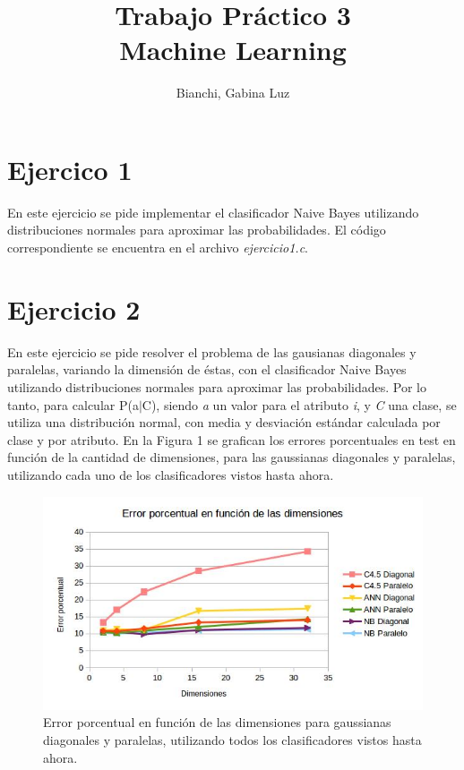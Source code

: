 \documentclass[12pt, a4paper]{article}
\begin{document}
 
\title{Trabajo Práctico 3\\ Machine Learning} 
\author{Bianchi, Gabina Luz} 
\maketitle

\section*{Ejercico 1}
En este ejercicio se pide implementar el clasificador Naive Bayes utilizando distribuciones normales para aproximar las probabilidades. El código correspondiente se encuentra en el archivo \textit{ejercicio1.c}.

\section*{Ejercicio 2}
 
 En este ejercicio se pide resolver el problema de las gausianas diagonales y paralelas, variando la dimensión de éstas, con el clasificador Naive Bayes utilizando distribuciones normales para aproximar las probabilidades. Por lo tanto, para calcular P(a$|$C), siendo \textit{a} un valor para el atributo \textit{i}, y \textit{C} una clase, se utiliza una distribución normal, con media y desviación estándar calculada por clase y por atributo. En la Figura 1 se grafican los errores porcentuales en test en función de la cantidad de dimensiones, para las gaussianas diagonales y paralelas, utilizando cada uno de los clasificadores vistos hasta ahora.
 
 \begin{figure}
    \centering
	\includegraphics[scale=0.8]{ejercicio2}
	\caption{Error porcentual en función de las dimensiones para gaussianas diagonales y paralelas, utilizando todos los clasificadores vistos hasta ahora.}
\end{figure}
\end{document}
